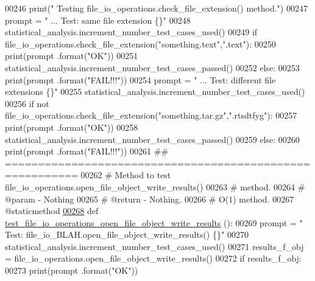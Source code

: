 \begin{DoxyCode}
00246         print(\textcolor{stringliteral}{" Testing file\_io\_operations.check\_file\_extension() method."})
00247         prompt = \textcolor{stringliteral}{"  ... Test: same file extension               \{\}"}
00248         statistical\_analysis.increment\_number\_test\_cases\_used()
00249         \textcolor{keywordflow}{if} file\_io\_operations.check\_file\_extension(\textcolor{stringliteral}{"something.text"},\textcolor{stringliteral}{".text"}):
00250             print(prompt .format(\textcolor{stringliteral}{"OK"}))
00251             statistical\_analysis.increment\_number\_test\_cases\_passed()
00252         \textcolor{keywordflow}{else}:
00253             print(prompt .format(\textcolor{stringliteral}{"FAIL!!!"}))
00254         prompt = \textcolor{stringliteral}{"  ... Test: different file extensions         \{\}"}
00255         statistical\_analysis.increment\_number\_test\_cases\_used()
00256         \textcolor{keywordflow}{if} \textcolor{keywordflow}{not} file\_io\_operations.check\_file\_extension(\textcolor{stringliteral}{"something.tar.gz"},\textcolor{stringliteral}{".rtsdtfyg"}):
00257             print(prompt .format(\textcolor{stringliteral}{"OK"}))
00258             statistical\_analysis.increment\_number\_test\_cases\_passed()
00259         \textcolor{keywordflow}{else}:
00260             print(prompt .format(\textcolor{stringliteral}{"FAIL!!!"}))
00261     \textcolor{comment}{## =========================================================}
00262     \textcolor{comment}{#   Method to test file\_io\_operations.open\_file\_object\_write\_results()}
00263     \textcolor{comment}{#       method.}
00264     \textcolor{comment}{#   @param - Nothing}
00265     \textcolor{comment}{#   @return - Nothing.}
00266     \textcolor{comment}{#   O(1) method.}
00267     @staticmethod
\hypertarget{file__io__tester_8py_source_l00268}{}\hyperlink{classutilities_1_1file__io__tester_1_1file__io__operations__tester_a7fa460b989d5a77396a182df39255eba}{00268}     \textcolor{keyword}{def }\hyperlink{classutilities_1_1file__io__tester_1_1file__io__operations__tester_a7fa460b989d5a77396a182df39255eba}{test\_file\_io\_operations\_open\_file\_object\_write\_results}
      ():
00269         prompt = \textcolor{stringliteral}{"  Test: file\_io\_BLAH.open\_file\_object\_write\_results() \{\}"}
00270         statistical\_analysis.increment\_number\_test\_cases\_used()
00271         results\_f\_obj = file\_io\_operations.open\_file\_object\_write\_results()
00272         \textcolor{keywordflow}{if} results\_f\_obj:
00273             print(prompt .format(\textcolor{stringliteral}{"OK"}))

\end{DoxyCode}
